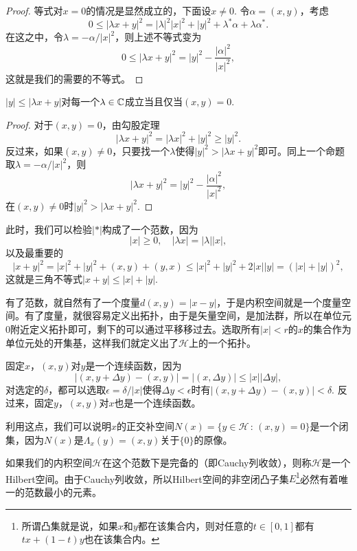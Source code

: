\begin{proof}
等式对$x=0$的情况是显然成立的，下面设$x\neq 0$. 令$\alpha=(x,y)$，考虑
	\[
		0\leq |\lambda x+y|^2=|\lambda|^2|x|^2+|y|^2+\lambda^* \alpha+\lambda \alpha^*.
	\]
	在这之中，令$\lambda=-\alpha/|x|^2$，则上述不等式变为
	\[
		0\leq |\lambda x+y|^2=|y|^2-\frac{|\alpha|^2}{|x|^2},
	\]
	这就是我们的需要的不等式。
\end{proof}

\begin{pro}
$|y|\leq |\lambda x+y|$对每一个$\lambda \in \mathbb{C}$成立当且仅当$(x,y)=0$.
\end{pro}

\begin{proof}
对于$(x,y)=0$，由勾股定理
\[
	|\lambda x+y|^2=|\lambda x|^2+ |y|^2\geq |y|^2.
\]
反过来，如果$(x,y)\neq 0$，只要找一个$\lambda$使得$|y|^2>|\lambda x+y|^2$即可。同上一个命题取$\lambda=-\alpha/|x|^2$，则
\[
	|\lambda x+y|^2=|y|^2-\frac{|\alpha|^2}{|x|^2},
\]
在$(x,y)\neq 0$时$|y|^2>|\lambda x+y|^2$. 
\end{proof}

此时，我们可以检验$|*|$构成了一个范数，因为
\[
	|x|\geq 0,\quad |\lambda x|=|\lambda||x|,
\]
以及最重要的
\[
	|x+y|^2=|x|^2+|y|^2+(x,y)+(y,x)\leq |x|^2+|y|^2+2|x||y|=(|x|+|y|)^2,
\]
这就是三角不等式$|x+y|\leq |x|+|y|$.

\begin{para}
有了范数，就自然有了一个度量$d(x,y)=|x-y|$，于是内积空间就是一个度量空间。有了度量，就很容易定义出拓扑，由于是矢量空间，是加法群，所以在单位元$0$附近定义拓扑即可，剩下的可以通过平移移过去。选取所有$|x|<r$的$x$的集合作为单位元处的开集基，这样我们就定义出了$\mathcal{H}$上的一个拓扑。

固定$x$，$(x,y)$对$y$是一个连续函数，因为
\[
	|(x,y+\Delta y)-(x,y)|=|(x,\Delta y)|\leq |x||\Delta y|,
\]
对选定的$\delta$，都可以选取$\epsilon=\delta/|x|$使得$\Delta y<\epsilon$时有$|(x,y+\Delta y)-(x,y)|<\delta$. 反过来，固定$y$，$(x,y)$对$x$也是一个连续函数。

利用这点，我们可以说明$x$的正交补空间$N(x)=\{y\in\mathcal{H}\,:\, (x,y)=0\}$是一个闭集，因为$N(x)$是$\Lambda_x(y)=(x,y)$关于$\{0\}$的原像。
\end{para}

\begin{para}
如果我们的内积空间$\mathcal{H}$在这个范数下是完备的（即Cauchy列收敛），则称$\mathcal{H}$是一个Hilbert空间。由于Cauchy列收敛，所以Hilbert空间的非空闭凸子集$E$\footnote{所谓凸集就是说，如果$x$和$y$都在该集合内，则对任意的$t\in [0,1]$都有$tx+(1-t)y$也在该集合内。}必然有着唯一的范数最小的元素。
\end{para}


